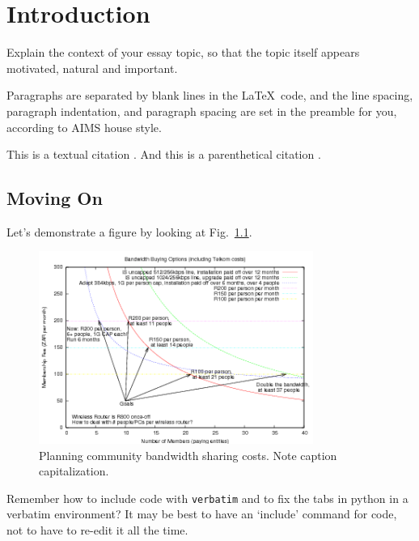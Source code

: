 \chapter{Introduction}

Explain the context of your essay topic, so that the
topic itself appears motivated, natural and important.

Paragraphs are separated by blank lines in the \LaTeX\ code, 
and the line spacing, paragraph indentation,
and paragraph spacing are set in the preamble for you, 
according to AIMS house style.

This is a textual citation \citet{shannon44}. And this is a parenthetical citation \citep{shannon44}.

\section{Moving On}
Let's demonstrate a figure by looking at Fig.\ \ref{bandwidth}. 

\begin{figure}[!h]
\centering 
\includegraphics[width=0.8\textwidth]{images/bandwidth-colour.png}
\caption{Planning community bandwidth sharing costs. 
  Note caption capitalization.}
\label{bandwidth} 
\end{figure}

Remember how to include code with {\tt verbatim} 
and to fix the tabs in {\sf python} in a verbatim environment? 
It may be best to have an `include' command for code, 
not to have to re-edit it all the time.


